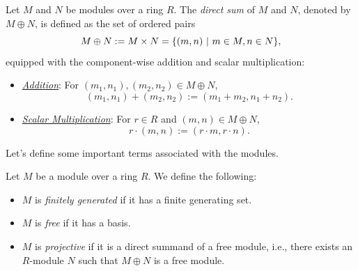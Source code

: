 \begin{definition}
	Let \(M\) and \(N\) be modules over a ring \(R\). The \emph{direct sum} of \(M\) and \(N\), denoted by \(M \oplus N\), is defined as the set of ordered pairs
	\begin{equation}
		M \oplus N := M \times N = \qty{(m, n) \ \middle|\ m \in M, n \in N},
	\end{equation}
	equipped with the component-wise addition and scalar multiplication:
	\begin{itemize}
		\item \uline{\emph{Addition}}: For \((m_1, n_1), (m_2, n_2) \in M \oplus N\),
		      \begin{equation}
			      (m_1, n_1) + (m_2, n_2) := (m_1 + m_2, n_1 + n_2).
		      \end{equation}
		\item \uline{\emph{Scalar Multiplication}}: For \(r \in R\) and \((m, n) \in M \oplus N\),
		      \begin{equation}
			      r \cdot (m, n) := (r \cdot m, r \cdot n).
		      \end{equation}
	\end{itemize}
\end{definition}
Let's define some important terms associated with the modules.

Let \(M\) be a module over a ring \(R\). We define the following:
\begin{itemize}
	\item \(M\) is \emph{finitely generated} if it has a finite generating set.
	\item \(M\) is \emph{free} if it has a basis.
	\item \(M\) is \emph{projective} if it is a direct summand of a free module, i.e., there exists an \(R\)-module \(N\) such that \(M \oplus N\) is a free module.
\end{itemize}

